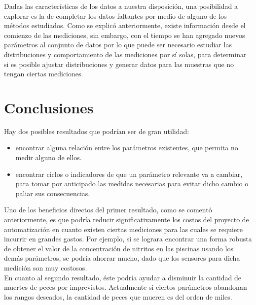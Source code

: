 \documentclass[letterpaper, 12pt]{article}
\begin{document}
Dadas las características de los datos a nuestra disposición, una posibilidad a explorar es la de completar los datos faltantes por medio de alguno de los métodos estudiados. Como se explicó anteriormente, existe información desde el comienzo de las mediciones, sin embargo, con el tiempo se han agregado nuevos parámetros al conjunto de datos por lo que puede ser necesario estudiar las distribuciones y comportamiento de las mediciones por sí solas, para determinar si es posible ajustar distribuciones y generar datos para las muestras que no tengan ciertas mediciones.


\section{Conclusiones}

Hay dos posibles resultados que podrían ser de gran utilidad:
\begin{itemize}
    \item encontrar alguna relación entre los  parámetros existentes, que permita no medir alguno de ellos.
    \item encontrar ciclos o indicadores de que un parámetro relevante va a cambiar, para tomar por anticipado las medidas necesarias para evitar dicho cambio o paliar sus consecuencias.
\end{itemize}

Uno de los beneficios directos del primer resultado, como se comentó anteriormente, es que podría reducir significativamente los costos del proyecto de automatización en cuanto existen ciertas mediciones para las cuales se requiere incurrir en grandes gastos. Por ejemplo, si se lograra encontrar una forma robusta de obtener el valor de la concentración de nitritos en las piscinas usando los demás parámetros, se podría ahorrar mucho, dado que los sensores para dicha medición son muy costosos.\\

En cuanto al segundo resultado, éste podría ayudar a disminuir la cantidad de muertes de peces por imprevistos. Actualmente si ciertos parámetros abandonan los rangos deseados, la cantidad de peces que mueren es del orden de miles.\\
\end{document}
